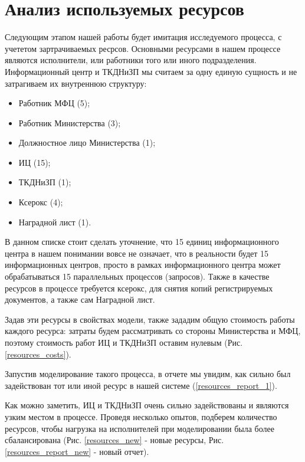 \chapter{Анализ используемых ресурсов}

Следующим этапом нашей работы будет имитация исследуемого
процесса, с учететом зартрачиваемых ресрсов. Основными
ресурсами в нашем процессе являются исполнители, или
работники того или иного подразделения. Информационный
центр и ТКДНиЗП мы считаем за одну единую сущность и не
затрагиваем их внутреннюю структуру:

\begin{itemize}
    \item Работник МФЦ (5);
    \item Работник Министерства (3);
    \item Должностное лицо Министерства (1);
    \item ИЦ (15);
    \item ТКДНиЗП (1);
    \item Ксерокс (4);
    \item Наградной лист (1).
\end{itemize}

В данном списке стоит сделать уточнение, что 15 единиц
информационного центра в нашем понимании вовсе не означает,
что в реальности будет 15 информационных центров, просто
в рамках информационного центра может обрабатываться 15
параллельных процессов (запросов). Также в качестве ресурсов
в процессе требуется ксерокс, для снятия копий регистрируемых
документов, а также сам Наградной лист.

Задав эти ресурсы в свойствах модели, также зададим общую
стоимость работы каждого ресурса: затраты будем
рассматривать со стороны Министерства и МФЦ, поэтому
стоимость работ ИЦ и ТКДНиЗП оставим нулевым
(Рис. \ref{resources_costs}).

Запустив моделирование такого процесса, в отчете мы увидим,
как сильно был задействован тот или иной ресурс в нашей
системе (\ref{resources_report_1}).

\clearpage

Как можно заметить, ИЦ и ТКДНиЗП очень сильно задействованы
и являются узким местом в процессе. Проведя несколько опытов,
подберем количество ресурсов, чтобы нагрузка на исполнителей
при моделировании была более сбалансирована
(Рис. \ref{resources_new} - новые ресурсы,
Рис. \ref{resources_report_new} - новый отчет).

